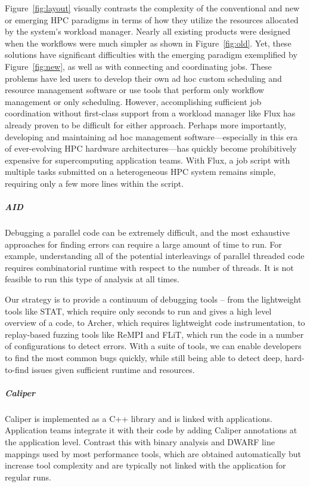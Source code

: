 Figure~\ref{fig:layout} visually contrasts
the complexity of the conventional and
new or emerging HPC paradigms in terms of
how they utilize the resources allocated
by the system's workload manager.
Nearly all existing products were designed
when the workflows were much simpler
as shown in Figure~\ref{fig:old}.
Yet, these solutions have significant difficulties with
the emerging paradigm exemplified
by Figure~\ref{fig:new},
as well as with connecting and coordinating jobs.
These problems have led users to develop their own ad hoc
custom scheduling and resource management software or use tools
that perform only workflow management or only scheduling.
However, accomplishing sufficient job coordination without
first-class support from a workload manager
like Flux has already proven to be difficult
for either approach.
Perhaps more importantly, developing and maintaining ad hoc management
software---especially in this era of ever-evolving HPC hardware
architectures---has quickly become prohibitively expensive for
supercomputing application teams.
With Flux, a job script with multiple
tasks submitted on a heterogeneous HPC system
remains simple, requiring only a few more lines within
the script.

\subparagraph{AID}

Debugging a parallel code can be extremely difficult, and the most
exhaustive approaches for finding errors can require a large amount of
time to run.  For example, understanding all of the potential
interleavings of parallel threaded code requires combinatorial runtime
with respect to the number of threads.  It is not feasible to run this
type of analysis at all times.

Our strategy is to provide a continuum of debugging tools -- from the
lightweight tools like STAT, which require only seconds to run and gives
a high level overview of a code, to Archer, which requires lightweight
code instrumentation, to replay-based fuzzing tools like ReMPI and FLiT,
which run the code in a number of configurations to detect errors.  With
a suite of tools, we can enable developers to find the most common bugs
quickly, while still being able to detect deep, hard-to-find issues given
sufficient runtime and resources.

\subparagraph{Caliper}
Caliper is implemented as a C++ library and is linked with applications.
Application teams integrate it with their code by adding Caliper
annotations at the application level.  Contrast this with binary analysis
and DWARF line mappings used by most performance tools, which are
obtained automatically but increase tool complexity and are typically
not linked with the application for regular runs.

